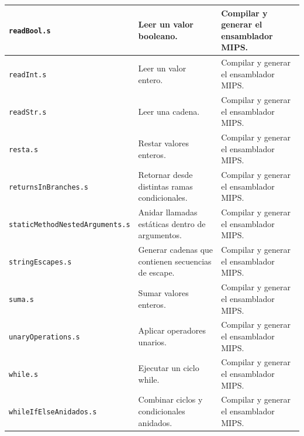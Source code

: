 \begin{longtable}{|>{\raggedright\arraybackslash}p{}|>{\raggedright\arraybackslash}p{}|>{\raggedright\arraybackslash}p{}|}
\texttt{readBool\allowbreak .s} & Leer un valor booleano. & Compilar y generar el ensamblador MIPS. \\ \hline
\texttt{readInt\allowbreak .s} & Leer un valor entero. & Compilar y generar el ensamblador MIPS. \\ \hline
\texttt{readStr\allowbreak .s} & Leer una cadena. & Compilar y generar el ensamblador MIPS. \\ \hline
\texttt{resta\allowbreak .s} & Restar valores enteros. & Compilar y generar el ensamblador MIPS. \\ \hline
\texttt{returnsInBranches\allowbreak .s} & Retornar desde distintas ramas condicionales. & Compilar y generar el ensamblador MIPS. \\ \hline
\texttt{staticMethodNestedArguments\allowbreak .s} & Anidar llamadas estáticas dentro de argumentos. & Compilar y generar el ensamblador MIPS. \\ \hline
\texttt{stringEscapes\allowbreak .s} & Generar cadenas que contienen secuencias de escape. & Compilar y generar el ensamblador MIPS. \\ \hline
\texttt{suma\allowbreak .s} & Sumar valores enteros. & Compilar y generar el ensamblador MIPS. \\ \hline
\texttt{unaryOperations\allowbreak .s} & Aplicar operadores unarios. & Compilar y generar el ensamblador MIPS. \\ \hline
\texttt{while\allowbreak .s} & Ejecutar un ciclo while. & Compilar y generar el ensamblador MIPS. \\ \hline
\texttt{whileIfElseAnidados\allowbreak .s} & Combinar ciclos y condicionales anidados. & Compilar y generar el ensamblador MIPS. \\ \hline
\end{longtable}
\endgroup
